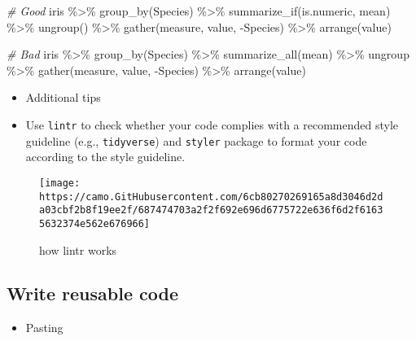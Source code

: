 \documentclass[
]{book}
\newenvironment{Shaded}{\begin{snugshade}}{\end{snugshade}}
\newcommand{\CommentTok}[1]{\textcolor[rgb]{0.56,0.35,0.01}{\textit{#1}}}
\newcommand{\FunctionTok}[1]{\textcolor[rgb]{0.00,0.00,0.00}{#1}}
\newcommand{\NormalTok}[1]{#1}
\newcommand{\SpecialCharTok}[1]{\textcolor[rgb]{0.00,0.00,0.00}{#1}}
\providecommand{\tightlist}{%
  \setlength{\itemsep}{0pt}\setlength{\parskip}{0pt}}
\begin{document}
\begin{Shaded}
\begin{Highlighting}[]
\CommentTok{\# Good}
\NormalTok{iris }\SpecialCharTok{\%\textgreater{}\%}
  \FunctionTok{group\_by}\NormalTok{(Species) }\SpecialCharTok{\%\textgreater{}\%}
  \FunctionTok{summarize\_if}\NormalTok{(is.numeric, mean) }\SpecialCharTok{\%\textgreater{}\%}
  \FunctionTok{ungroup}\NormalTok{() }\SpecialCharTok{\%\textgreater{}\%}
  \FunctionTok{gather}\NormalTok{(measure, value, }\SpecialCharTok{{-}}\NormalTok{Species) }\SpecialCharTok{\%\textgreater{}\%}
  \FunctionTok{arrange}\NormalTok{(value)}

\CommentTok{\# Bad}
\NormalTok{iris }\SpecialCharTok{\%\textgreater{}\%} \FunctionTok{group\_by}\NormalTok{(Species) }\SpecialCharTok{\%\textgreater{}\%} \FunctionTok{summarize\_all}\NormalTok{(mean) }\SpecialCharTok{\%\textgreater{}\%}
\NormalTok{ungroup }\SpecialCharTok{\%\textgreater{}\%} \FunctionTok{gather}\NormalTok{(measure, value, }\SpecialCharTok{{-}}\NormalTok{Species) }\SpecialCharTok{\%\textgreater{}\%}
\FunctionTok{arrange}\NormalTok{(value)}
\end{Highlighting}
\end{Shaded}

\begin{itemize}
\item
  Additional tips
\item
  Use \texttt{lintr} to check whether your code complies with a recommended style guideline (e.g., \texttt{tidyverse}) and \texttt{styler} package to format your code according to the style guideline.
\end{itemize}

\begin{figure}
\centering
\texttt{[image: https://camo.GitHubusercontent.com/6cb80270269165a8d3046d2da03cbf2b8f19ee2f/687474703a2f2f692e696d6775722e636f6d2f61635632374e562e676966]}
\caption{how lintr works}
\end{figure}

\hypertarget{write-reusable-code}{%
\subsection{Write reusable code}\label{write-reusable-code}}

\begin{itemize}
\tightlist
\item
  Pasting
\end{itemize}
\end{document}

